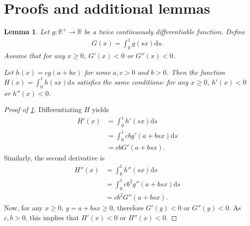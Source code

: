 \documentclass[a4paper]{article}
\newtheorem{lemma}{Lemma}
\newcommand{\ds}{\mathrm{d}s}
\begin{document}
\section{Proofs and additional lemmas}

\begin{lemma}
    \label{lem:single_crossing_affine_transformation}
    Let $g: \mathbb{R}^+ \to \mathbb{R}$ be a twice continuously differentiable function.
    Define
    \begin{align*}
        G(x) = \int_0^1 g(sx) \ds.
    \end{align*}
    Assume that for any $x \geq 0$, $G'(x) < 0$ or $G''(x) < 0$.

    Let $h(x) = c g(a + bx)$ for some $a, c > 0$ and $b > 0$.
    Then the function $H(x) = \int_0^1 h(sx) \ds$ satisfies the same conditions: for any $x \geq 0$, $h'(x) < 0$ or $h''(x) < 0$.
\end{lemma}
\begin{proof}[Proof of \cref{lem:single_crossing_affine_transformation}]
    Differentiating $H$ yields
    \begin{align*}
        H'(x) &= \int_0^1 h'(sx) \ds \\
              &= \int_0^1 c b g'(a + bsx) \ds \\
              &= c b G'(a + bsx).
    \end{align*}
    Similarly, the second derivative is
    \begin{align*}
        H''(x) &= \int_0^1 h''(sx) \ds \\
               &= \int_0^1 c b^2 g''(a + bsx) \ds \\
               &= c b^2 G''(a + bsx).
    \end{align*}
    Now, for any $x \geq 0$, $y = a + bsx \geq 0$, therefore $G'(y) < 0$ or $G''(y) < 0$.
    As $c, b > 0$, this implies that $H'(x) < 0$ or $H''(x) < 0$.
\end{proof}
\end{document}
